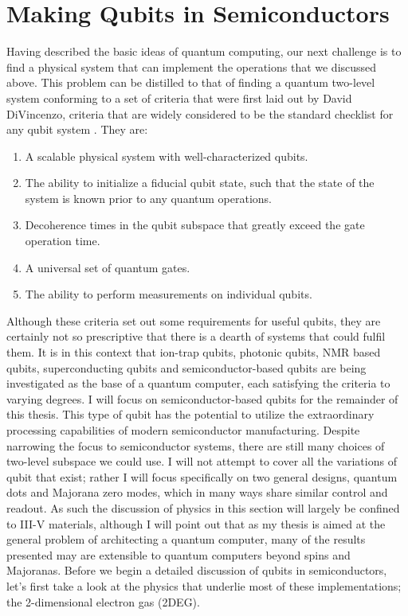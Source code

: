 \section{Making Qubits in Semiconductors}
\label{sec:qcinsm}
Having described the basic ideas of quantum computing, our next challenge is to find a physical system that
can implement the operations that we discussed above. This problem can be distilled to that
of finding a quantum two-level system conforming to a set of criteria that were first laid out by David
DiVincenzo, criteria that are widely considered to be the standard checklist for any qubit system \cite{divincenzo_crit}. They are:
\begin{enumerate}
  \item A scalable physical system with well-characterized qubits.
  \item The ability to initialize a fiducial qubit state, such that the state of the system is known prior
    to any quantum operations.
  \item Decoherence times in the qubit subspace that greatly exceed the gate operation time.
  \item A universal set of quantum gates.
  \item The ability to perform measurements on individual qubits.
\end{enumerate}
Although these criteria set out some requirements for useful qubits, they are certainly not so prescriptive
that there is a dearth of systems that could fulfil them. It is in this context that ion-trap qubits, photonic qubits,
NMR based qubits, superconducting qubits and semiconductor-based qubits are being investigated as the base of a quantum computer, each satisfying the
criteria to varying degrees. I will focus on semiconductor-based qubits for the remainder of this thesis. This type
of qubit has the potential to utilize the extraordinary processing capabilities of modern semiconductor manufacturing.
Despite narrowing the focus to semiconductor systems, there are still many
choices of two-level subspace we could use. I will not attempt to cover all the variations
of qubit that exist; rather I will focus specifically on two general designs, quantum dots and Majorana zero modes,
which in many ways share similar control and readout. As such the discussion of physics in this section will
largely be confined to III-V materials, although I will point out that as my thesis is aimed at the general
problem of architecting a quantum computer, many of the results presented may are extensible to quantum
computers beyond spins and Majoranas. Before we begin a detailed discussion of qubits in semiconductors, let's first take a look
at the physics that underlie most of these implementations; the 2-dimensional electron gas (2DEG).

